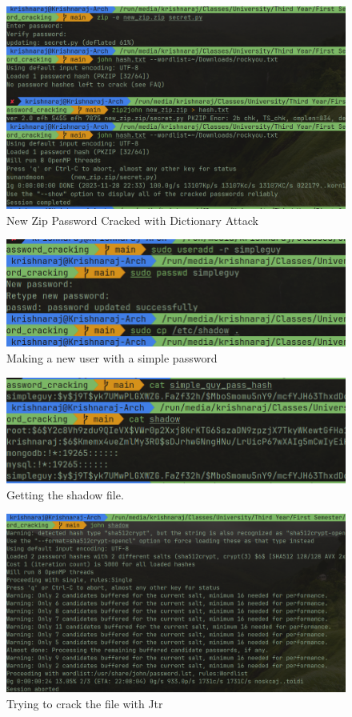 \documentclass[11pt]{article}
\begin{document}
\begin{figure}[H]
    \centering
    \includegraphics[width=.95\textwidth]{john the ripper/zip_with_new.png}
    \caption{New Zip Password Cracked with Dictionary Attack}
\end{figure}

\begin{figure}[H]
    \centering
    \includegraphics[width=.95\textwidth]{john the ripper/new user.png}
    \caption{Making a new user with a simple password}
\end{figure}

\begin{figure}[H]
    \centering
    \includegraphics[width=.95\textwidth]{john the ripper/shadow.png}
    \caption{Getting the shadow file. }
\end{figure}

\begin{figure}[H]
    \centering
    \includegraphics[width=.95\textwidth]{john the ripper/john shadow.png}
    \caption{Trying to crack the file with Jtr}
\end{figure}
\end{document}
